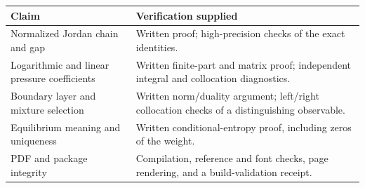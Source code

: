 \documentclass[11pt,a4paper]{article}
\numberwithin{equation}{section}
\theoremstyle{definition}
\theoremstyle{remark}
\begin{document}
\begin{center}\small
\begin{tabular}{@{}p{}p{}@{}}
\toprule
\textbf{Claim} & \textbf{Verification supplied}\\
\midrule
Normalized Jordan chain and gap & Written proof; high-precision checks
of the exact identities.\\[1.5mm]
Logarithmic and linear pressure coefficients & Written finite-part and
matrix proof; independent integral and collocation diagnostics.\\[1.5mm]
Boundary layer and mixture selection & Written norm/duality argument;
left/right collocation checks of a distinguishing observable.\\[1.5mm]
Equilibrium meaning and uniqueness & Written conditional-entropy proof,
including zeros of the weight.\\[1.5mm]
PDF and package integrity & Compilation, reference and font checks,
page rendering, and a build-validation receipt.\\
\bottomrule
\end{tabular}
\end{center}
\end{document}
